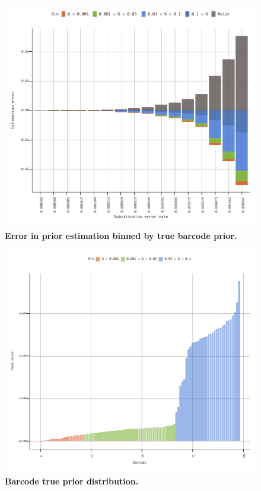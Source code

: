 \documentclass[10pt,twocolumn]{article}
\begin{document}
\begin{figure}[htbp]
\centering
\includegraphics[keepaspectratio,scale=1]{../plot/12_prior_estimation_error_0550_binned}
\caption{\footnotesize{\textbf{Error in prior estimation binned by true barcode prior. } } }
\label{fig:12}
\end{figure}

\begin{figure}[htbp]
\centering
\includegraphics[keepaspectratio,scale=1]{../plot/13_barcode_distribution}
\caption{\footnotesize{\textbf{Barcode true prior distribution. } } }
\label{fig:13}
\end{figure}
\end{document}
